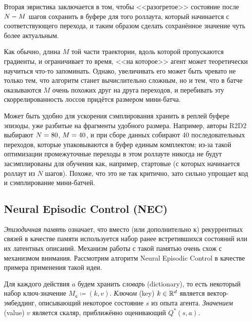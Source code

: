 Вторая эвристика заключается в том, чтобы <<разогретое>> состояние после $N \HM- M$ шагов сохранить в буфере для того роллаута, который начинается с соответствующего перехода, и таким образом сделать сохранённое значение чуть более актуальным.

Как обычно, длина $M$ той части траектории, вдоль которой пропускаются градиенты, и ограничивает то время, <<на которое>> агент может теоретически научиться что-то запоминать. Однако, увеличивать его может быть чревато не только тем, что алгоритм станет вычислительно сложным, но и тем, что в батче оказываются $M$ очень похожих друг на друга переходов, и перебивать эту скоррелированность лоссов придётся размером мини-батча.

\begin{remark}
Может быть удобно для ускорения сэмплирования хранить в реплей буфере эпизоды, уже разбитые на фрагменты удобного размера. Например, авторы R2D2 выбирают $N \HM= 80$, $M \HM= 40$, и при сборе данных собирают 40 последовательных переходов, которые упаковываются в буфер единым комплектом; из-за такой оптимизации промежуточные переходы в этом роллауте никогда не будут засэмплированы для обучения как, например, стартовые (с которых начинается роллаут из $N$ шагов). Похоже, что это не так критично, зато сильно упрощает код и сэмплирование мини-батчей.
\end{remark}

\subsection{Neural Episodic Control (NEC)}

\emph{Эпизодичная память} означает, что вместо (или дополнительно к) рекуррентных связей в качестве памяти используется набор ранее встретившихся состояний или их латентных описаний. Механизм работы с такой памятью очень схож с механизмом внимания. Рассмотрим алгоритм Neural Episodic Control в качестве примера применения такой идеи.

Для каждого действия $a$ будем хранить \emph{словарь} (dictionary), то есть некоторый набор ключ-значение $M_a \coloneqq (k, v)$. \emph{Ключом} (key) $k \in \mathbb{R}^d$ является вектор-эмбеддинг, описывающий некоторое состояние $s$ из опыта агента. \emph{Значением} (value) $v$ является скаляр, приближённо оценивающий $Q^*(s, a)$.

